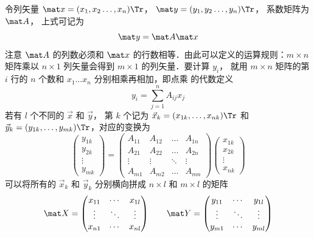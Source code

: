 令列矢量 $\mat x = (x_1,x_2 \dots, x_n)\Tr $，  $\mat y = (y_1,y_2 \dots, y_n)\Tr$， 系数矩阵为 $\mat A$， 上式可记为
\begin{equation}\label{Mat_eq5}
\mat y = \mat A\mat x
\end{equation} 
注意 $\mat A$ 的列数必须和 $\mat x$ 的行数相等．由此可以定义的运算规则：$m \times n$ 矩阵乘以 $n \times 1$ 列矢量会得到 $m \times 1$ 的列矢量．要计算 $y_i$， 就用 $m \times n$ 矩阵的第 $i$ 行的 $n$ 个数和 $x_1 \dots x_n$ 分别相乘再相加，即点乘 的代数定义
\begin{equation}
y_i = \sum_{j = 1}^n A_{ij} x_j 
\end{equation}
若有 $l$ 个不同的 $\vec x$ 和 $\vec y$， 第 $k$ 个记为 $\vec x_k = (x_{1k},\dots, x_{nk})\Tr$ 和 $\vec y_k = (y_{1k},\dots, y_{mk})\Tr$，对应的变换为
\begin{equation}
\begin{pmatrix} y_{1k} \\ y_{2k}\\ \vdots \\ y_{mk} \end{pmatrix}
= \begin{pmatrix}
A_{11}  & A_{12} & \ldots & A_{1n} \\
A_{21}  & A_{22} & \ldots & A_{2n} \\
 \vdots & \vdots  & \ddots & \vdots \\
A_{m1}  & A_{m2} & \ldots & A_{mn}
\end{pmatrix}
\begin{pmatrix} x_{1k} \\ x_{2k} \\ \vdots \\ x_{nk} \end{pmatrix}
\end{equation}
可以将所有的 $\vec x_k$ 和 $\vec y_k$ 分别横向拼成 $n \times l$ 和 $m \times l$ 的矩阵
\begin{equation}
\mat X =
\begin{pmatrix}
x_{11} & \cdots & x_{1l} \\
 \vdots & \ddots & \vdots \\
x_{n1} & \cdots & x_{nl}
\end{pmatrix}
\qquad
\mat Y =
\begin{pmatrix}
y_{11} & \cdots & y_{1l} \\
 \vdots & \ddots & \vdots \\
y_{m1} & \cdots & y_{ml}
\end{pmatrix}
\end{equation}
